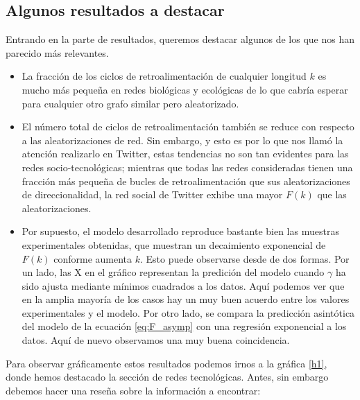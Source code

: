 \documentclass[1p]{elsarticle}
\begin{document}
\subsection{Algunos resultados a destacar}
Entrando en la parte de resultados, queremos destacar algunos de los que nos han parecido más relevantes.
\begin{itemize}
	\item La fracción de los ciclos de retroalimentación de cualquier longitud $k$ es mucho más pequeña en redes biológicas y ecológicas de lo que cabría esperar para cualquier otro grafo similar pero aleatorizado.
	\item El número total de ciclos de retroalimentación también se reduce 
	con respecto a las aleatorizaciones de red. Sin embargo, y esto es por lo que nos llamó la atención realizarlo en Twitter, estas tendencias no son tan evidentes para las redes socio-tecnológicas; mientras que todas las redes consideradas tienen una fracción más pequeña de bucles de retroalimentación que sus aleatorizaciones de direccionalidad, la red social de Twitter exhibe una mayor $F(k)$ que las aleatorizaciones.
	\item Por supuesto, el modelo desarrollado reproduce bastante bien las muestras experimentales obtenidas, que muestran un decaimiento exponencial de $F(k)$ conforme aumenta $k$.
        Esto puede observarse desde de dos formas.
        Por un lado, las X en el gráfico representan la predición del modelo cuando $\gamma$ ha sido ajusta mediante mínimos cuadrados a los datos.
        Aquí podemos ver que en la amplia mayoría de los casos hay un muy buen acuerdo entre los valores experimentales y el modelo.
        Por otro lado, se compara la predicción asintótica del modelo de la ecuación \ref{eq:F_asymp} con una regresión exponencial a los datos.
        Aquí de nuevo observamos una muy buena coincidencia.
        
\end{itemize}

Para observar gráficamente estos resultados podemos irnos a la gráfica \ref{h1}, donde hemos destacado la sección de redes tecnológicas. Antes, sin embargo debemos hacer una reseña sobre la información a encontrar:
\end{document}
